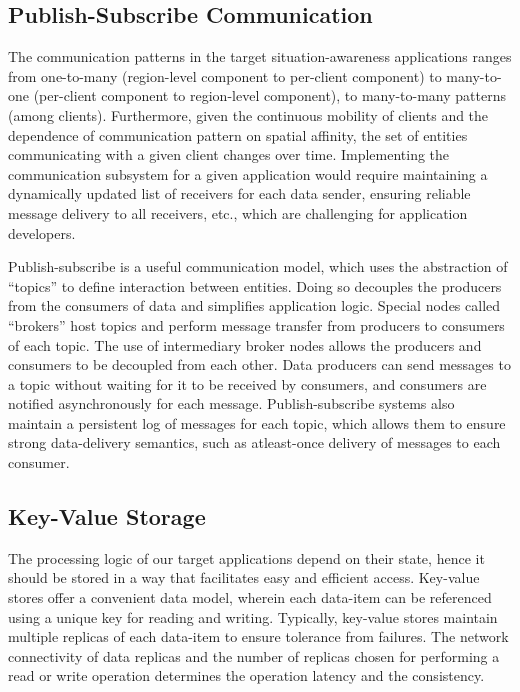 \subsection{Publish-Subscribe Communication}
The communication patterns in the target situation-awareness applications ranges from one-to-many (region-level component to per-client component) to many-to-one (per-client component to region-level component), to many-to-many patterns (among clients). Furthermore, given the continuous mobility of clients and the dependence of communication pattern on spatial affinity, the set of entities communicating with a given client changes over time. Implementing the communication subsystem for a given application would require maintaining a dynamically updated list of receivers for each data sender, ensuring reliable message delivery to all receivers, etc., which are challenging for application developers.
\par Publish-subscribe is a useful communication model, which uses the abstraction of ``topics'' to define interaction between entities. Doing so decouples the producers from the consumers of data and simplifies application logic. Special nodes called ``brokers'' host topics and perform message transfer from producers to consumers of each topic. The use of intermediary broker nodes allows the producers and consumers to be decoupled from each other. Data producers can send messages to a topic without waiting for it to be received by consumers, and consumers are notified asynchronously for each message. Publish-subscribe systems also maintain a persistent log of messages for each topic, which allows them to ensure strong data-delivery semantics, such as atleast-once delivery of messages to each consumer.

\subsection{Key-Value Storage}
The processing logic of our target applications depend on their state, hence it should be stored in a way that facilitates easy and efficient access. Key-value stores offer a convenient data model, wherein each data-item can be referenced using a unique key for reading and writing. Typically, key-value stores maintain multiple replicas of each data-item to ensure tolerance from failures. The network connectivity of data replicas and the number of replicas chosen for performing a read or write operation determines the operation latency and the consistency. 


